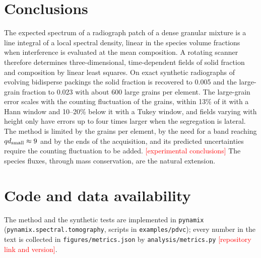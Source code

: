 \documentclass[11pt]{article}
\newcommand{\todo}[1]{\textcolor{red}{[#1]}}
\begin{document}
\section{Conclusions}

The expected spectrum of a radiograph patch of a dense granular mixture is a
line integral of a local spectral density, linear in the species volume
fractions when interference is evaluated at the mean composition. A rotating
scanner therefore determines three-dimensional, time-dependent fields of
solid fraction and composition by linear least squares. On exact synthetic
radiographs of evolving bidisperse packings the solid fraction is recovered
to 0.005 and the large-grain fraction to 0.023 with about 600 large grains
per element. The large-grain error scales with the counting fluctuation of the
grains, within 13\% of it with a Hann window and 10--20\% below it with a
Tukey window, and fields varying with height only have errors up to four
times larger when the segregation is lateral. The method
is limited by the grains per element, by the need for a band reaching
$qd_{\rm small}\approx9$ and by the ends of the acquisition, and its
predicted uncertainties require the counting fluctuation to be added.
\todo{experimental conclusions} The species fluxes, through mass
conservation, are the natural extension.

\section*{Code and data availability}
The method and the synthetic tests are implemented in \texttt{pynamix}
(\texttt{pynamix.spectral.tomography}, scripts in \texttt{examples/pdvc});
every number in the text is collected in \texttt{figures/metrics.json} by
\texttt{analysis/metrics.py} \todo{repository link and version}.
\end{document}
